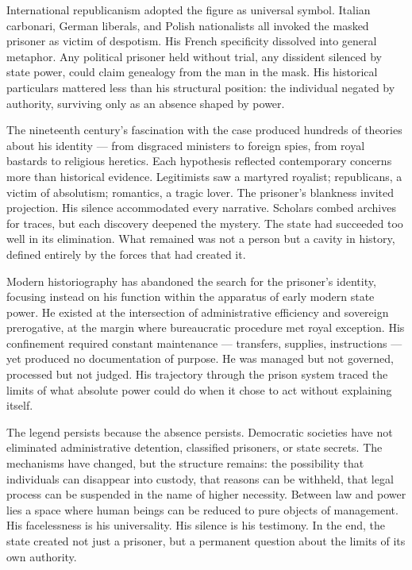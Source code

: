 International republicanism adopted the figure as universal symbol. Italian carbonari, German liberals, and Polish nationalists all invoked the masked prisoner as victim of despotism. His French specificity dissolved into general metaphor. Any political prisoner held without trial, any dissident silenced by state power, could claim genealogy from the man in the mask. His historical particulars mattered less than his structural position: the individual negated by authority, surviving only as an absence shaped by power.

The nineteenth century's fascination with the case produced hundreds of theories about his identity — from disgraced ministers to foreign spies, from royal bastards to religious heretics. Each hypothesis reflected contemporary concerns more than historical evidence. Legitimists saw a martyred royalist; republicans, a victim of absolutism; romantics, a tragic lover. The prisoner's blankness invited projection. His silence accommodated every narrative. Scholars combed archives for traces, but each discovery deepened the mystery. The state had succeeded too well in its elimination. What remained was not a person but a cavity in history, defined entirely by the forces that had created it.

Modern historiography has abandoned the search for the prisoner's identity, focusing instead on his function within the apparatus of early modern state power. He existed at the intersection of administrative efficiency and sovereign prerogative, at the margin where bureaucratic procedure met royal exception. His confinement required constant maintenance — transfers, supplies, instructions — yet produced no documentation of purpose. He was managed but not governed, processed but not judged. His trajectory through the prison system traced the limits of what absolute power could do when it chose to act without explaining itself.

The legend persists because the absence persists. Democratic societies have not eliminated administrative detention, classified prisoners, or state secrets. The mechanisms have changed, but the structure remains: the possibility that individuals can disappear into custody, that reasons can be withheld, that legal process can be suspended in the name of higher necessity. Between law and power lies a space where human beings can be reduced to pure objects of management. His facelessness is his universality. His silence is his testimony. In the end, the state created not just a prisoner, but a permanent question about the limits of its own authority.
